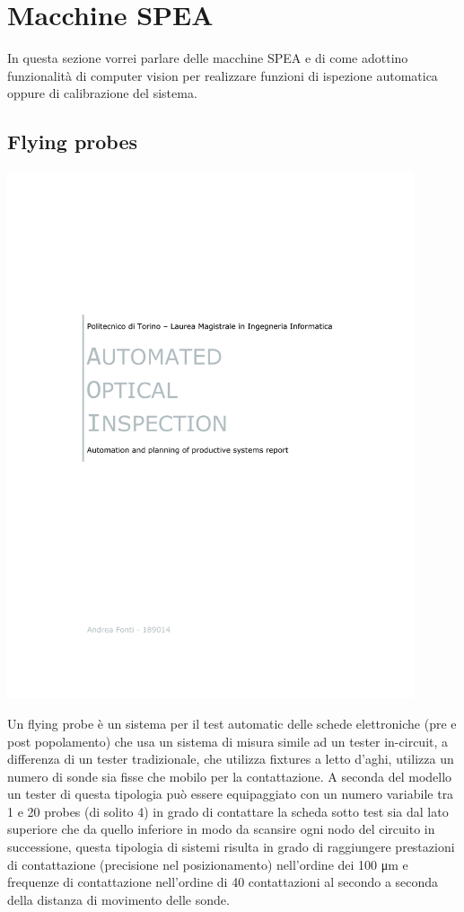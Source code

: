 \section{Macchine SPEA}
In questa sezione vorrei parlare delle macchine SPEA e di come adottino
funzionalità di computer vision per realizzare funzioni di ispezione automatica
oppure di calibrazione del sistema.
\subsection{Flying probes}

\includegraphics[clip=true, trim= 50 540 50 120,page=18,width=0.9\textwidth]{materiale/tesina-carlucci.pdf}
		


Un flying probe è un sistema per il test automatic delle schede elettroniche (pre e post popolamento) che 
usa un sistema di misura simile ad un tester in-circuit, a differenza di un tester tradizionale, che utilizza fixtures a letto d’aghi, utilizza un numero di sonde sia fisse che mobilo per la contattazione. 
A seconda del modello un tester di questa tipologia può essere equipaggiato con un numero variabile tra 
1 e 20 probes (di solito 4) in grado di contattare la scheda sotto test sia dal lato superiore che da quello inferiore in modo da scansire ogni nodo del circuito in successione, questa tipologia di sistemi risulta in grado di raggiungere prestazioni di contattazione (precisione nel posizionamento) nell’ordine dei  100 μm e frequenze di contattazione nell’ordine di 40 contattazioni al secondo a seconda della distanza di movimento delle sonde. 


